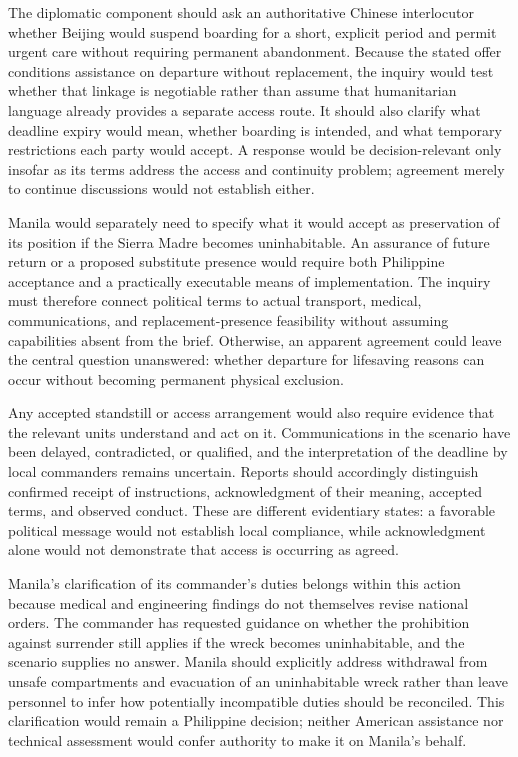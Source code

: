 \documentclass[11pt]{article}
\begin{document}
The diplomatic component should ask an authoritative Chinese interlocutor whether Beijing would suspend boarding for a short, explicit period and permit urgent care without requiring permanent abandonment. Because the stated offer conditions assistance on departure without replacement, the inquiry would test whether that linkage is negotiable rather than assume that humanitarian language already provides a separate access route. It should also clarify what deadline expiry would mean, whether boarding is intended, and what temporary restrictions each party would accept. A response would be decision-relevant only insofar as its terms address the access and continuity problem; agreement merely to continue discussions would not establish either.

Manila would separately need to specify what it would accept as preservation of its position if the Sierra Madre becomes uninhabitable. An assurance of future return or a proposed substitute presence would require both Philippine acceptance and a practically executable means of implementation. The inquiry must therefore connect political terms to actual transport, medical, communications, and replacement-presence feasibility without assuming capabilities absent from the brief. Otherwise, an apparent agreement could leave the central question unanswered: whether departure for lifesaving reasons can occur without becoming permanent physical exclusion.

Any accepted standstill or access arrangement would also require evidence that the relevant units understand and act on it. Communications in the scenario have been delayed, contradicted, or qualified, and the interpretation of the deadline by local commanders remains uncertain. Reports should accordingly distinguish confirmed receipt of instructions, acknowledgment of their meaning, accepted terms, and observed conduct. These are different evidentiary states: a favorable political message would not establish local compliance, while acknowledgment alone would not demonstrate that access is occurring as agreed.

Manila\textquoteright{}s clarification of its commander\textquoteright{}s duties belongs within this action because medical and engineering findings do not themselves revise national orders. The commander has requested guidance on whether the prohibition against surrender still applies if the wreck becomes uninhabitable, and the scenario supplies no answer. Manila should explicitly address withdrawal from unsafe compartments and evacuation of an uninhabitable wreck rather than leave personnel to infer how potentially incompatible duties should be reconciled. This clarification would remain a Philippine decision; neither American assistance nor technical assessment would confer authority to make it on Manila\textquoteright{}s behalf.
\end{document}
